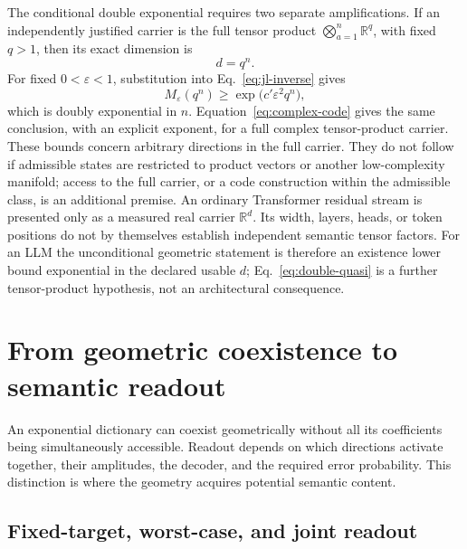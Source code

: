 \documentclass[
  aps,
  reprint,
  superscriptaddress,
  floatfix,
  nofootinbib,
  longbibliography
]{revtex4-2}
\newcommand{\R}{\mathbb{R}}
\begin{document}
The conditional double exponential requires two separate amplifications.  If
an independently justified carrier is the full tensor product
$\bigotimes_{a=1}^{n}\R^q$, with fixed $q>1$, then its exact dimension is
\begin{equation}
\label{eq:product-dimension}
d=q^n.
\end{equation}
For fixed $0<\varepsilon<1$, substitution into Eq.~\eqref{eq:jl-inverse} gives
\begin{equation}
\label{eq:double-quasi}
M_\varepsilon(q^n)
\geq
\exp\!\bigl(c'\varepsilon^2q^n\bigr),
\end{equation}
which is doubly exponential in $n$.  Equation~\eqref{eq:complex-code} gives
the same conclusion, with an explicit exponent, for a full complex
tensor-product carrier.  These bounds concern arbitrary directions in the
full carrier.  They do not follow if admissible states are restricted to
product vectors or another low-complexity manifold; access to the full carrier,
or a code construction within the admissible class, is an additional premise.
An ordinary Transformer residual stream is presented only as a measured real
carrier $\R^d$.  Its width, layers, heads, or token positions do not by
themselves establish independent semantic tensor factors.  For an LLM the
unconditional geometric statement is therefore an existence lower bound
exponential in the declared usable $d$; Eq.~\eqref{eq:double-quasi} is a
further tensor-product hypothesis,
not an architectural consequence.

\section{From geometric coexistence to semantic readout}
\label{sec:dictionary-readout}

An exponential dictionary can coexist geometrically without all its
coefficients being simultaneously accessible.  Readout depends on which
directions activate together, their amplitudes, the decoder, and the required
error probability.  This distinction is where the geometry acquires
potential semantic content.

\subsection{Fixed-target, worst-case, and joint readout}
\end{document}
